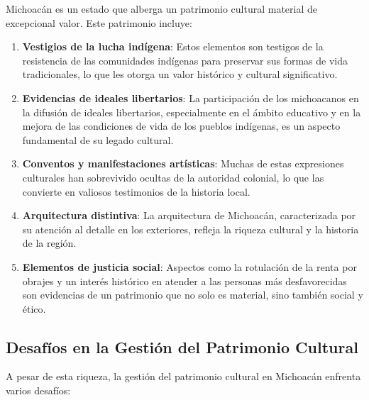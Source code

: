 \documentclass[
  spanish,
  11pt,
  a4paper,
]{scrbook}
\providecommand{\tightlist}{%
  \setlength{\itemsep}{0pt}\setlength{\parskip}{0pt}}
\begin{document}
Michoacán es un estado que alberga un patrimonio cultural material de
excepcional valor. Este patrimonio incluye:

\begin{enumerate}
\def\labelenumi{\arabic{enumi}.}
\tightlist
\item
  \textbf{Vestigios de la lucha indígena}: Estos elementos son testigos
  de la resistencia de las comunidades indígenas para preservar sus
  formas de vida tradicionales, lo que les otorga un valor histórico y
  cultural significativo.
\item
  \textbf{Evidencias de ideales libertarios}: La participación de los
  michoacanos en la difusión de ideales libertarios, especialmente en el
  ámbito educativo y en la mejora de las condiciones de vida de los
  pueblos indígenas, es un aspecto fundamental de su legado cultural.
\item
  \textbf{Conventos y manifestaciones artísticas}: Muchas de estas
  expresiones culturales han sobrevivido ocultas de la autoridad
  colonial, lo que las convierte en valiosos testimonios de la historia
  local.
\item
  \textbf{Arquitectura distintiva}: La arquitectura de Michoacán,
  caracterizada por su atención al detalle en los exteriores, refleja la
  riqueza cultural y la historia de la región.
\item
  \textbf{Elementos de justicia social}: Aspectos como la rotulación de
  la renta por obrajes y un interés histórico en atender a las personas
  más desfavorecidas son evidencias de un patrimonio que no solo es
  material, sino también social y ético.
\end{enumerate}

\subsection*{Desafíos en la Gestión del Patrimonio
Cultural}\label{desafuxedos-en-la-gestiuxf3n-del-patrimonio-cultural}

A pesar de esta riqueza, la gestión del patrimonio cultural en Michoacán
enfrenta varios desafíos:
\end{document}
